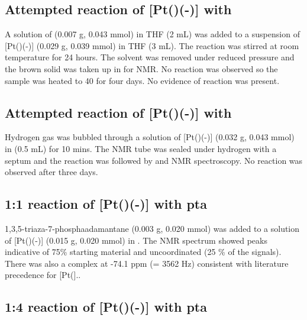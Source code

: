 \subsection*{Attempted reaction of \texorpdfstring{[Pt(\tButhixantphos)(-)]} P with \texorpdfstring{} N}

A solution of  (0.007 g, 0.043 mmol) in THF (2 mL) was added to a suspension of  [Pt(\tButhixantphos)(-)] (0.029 g, 0.039 mmol) in THF (3 mL).  The reaction was stirred at room temperature for 24 hours.  The solvent was removed under reduced pressure and the brown solid was taken up in  for NMR.  No reaction was observed so the sample was heated to 40 \degC{} for four days.  No evidence of reaction was present.  

\subsection*{Attempted reaction of \texorpdfstring{[Pt(\tButhixantphos)(-)]} P with \texorpdfstring{} H}

Hydrogen gas was bubbled through a solution of [Pt(\tButhixantphos)(-)] (0.032 g, 0.043 mmol) in  (0.5 mL) for 10 mins.  The NMR tube was sealed under hydrogen with a septum and the reaction was followed by \proton{} and \phosphorus{} NMR spectroscopy.  No reaction was observed after three days.  

\subsection*{1:1 reaction of \texorpdfstring{[Pt(\tButhixantphos)(-)]} P with pta}

1,3,5-triaza-7-phosphaadamantane (0.003 g, 0.020 mmol) was added to a solution of [Pt(\tButhixantphos)(-)] (0.015 g, 0.020 mmol) in .  The \phosphorus{} NMR spectrum showed peaks indicative of 75\% starting material and uncoordinated \tButhixantphos{} (25 \% of the \tButhixantphos{} signals).  There was also a complex at -74.1 ppm (\JPtP = 3562 Hz) consistent with literature precedence for [Pt(]..

\subsection*{1:4 reaction of \texorpdfstring{[Pt(\tButhixantphos)(-)]} P with pta}

